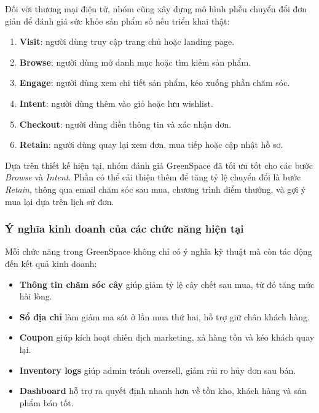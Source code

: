 \documentclass[11pt, a4paper]{article}
\begin{document}
Đối với thương mại điện tử, nhóm cũng xây dựng mô hình phễu chuyển đổi đơn giản để
đánh giá sức khỏe sản phẩm số nếu triển khai thật:

\begin{enumerate}[leftmargin=*]
    \item \textbf{Visit}: người dùng truy cập trang chủ hoặc landing page.
    \item \textbf{Browse}: người dùng mở danh mục hoặc tìm kiếm sản phẩm.
    \item \textbf{Engage}: người dùng xem chi tiết sản phẩm, kéo xuống phần chăm sóc.
    \item \textbf{Intent}: người dùng thêm vào giỏ hoặc lưu wishlist.
    \item \textbf{Checkout}: người dùng điền thông tin và xác nhận đơn.
    \item \textbf{Retain}: người dùng quay lại xem đơn, mua tiếp hoặc cập nhật hồ sơ.
\end{enumerate}

Dựa trên thiết kế hiện tại, nhóm đánh giá GreenSpace đã tối ưu tốt cho các bước
\textit{Browse} và \textit{Intent}. Phần có thể cải thiện thêm để tăng tỷ lệ chuyển đổi
là bước \textit{Retain}, thông qua email chăm sóc sau mua, chương trình điểm thưởng,
và gợi ý mua lại dựa trên lịch sử đơn.

\subsubsection{Ý nghĩa kinh doanh của các chức năng hiện tại}

Mỗi chức năng trong GreenSpace không chỉ có ý nghĩa kỹ thuật mà còn tác động đến kết quả kinh doanh:

\begin{itemize}[leftmargin=*]
    \item \textbf{Thông tin chăm sóc cây} giúp giảm tỷ lệ cây chết sau mua, từ đó tăng mức hài lòng.
    \item \textbf{Sổ địa chỉ} làm giảm ma sát ở lần mua thứ hai, hỗ trợ giữ chân khách hàng.
    \item \textbf{Coupon} giúp kích hoạt chiến dịch marketing, xả hàng tồn và kéo khách quay lại.
    \item \textbf{Inventory logs} giúp admin tránh oversell, giảm rủi ro hủy đơn sau bán.
    \item \textbf{Dashboard} hỗ trợ ra quyết định nhanh hơn về tồn kho, khách hàng và sản phẩm bán tốt.
\end{itemize}
\end{document}
